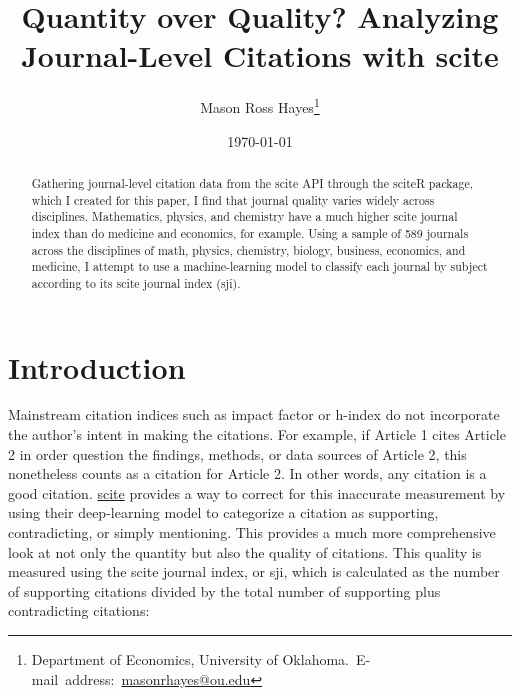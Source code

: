 \documentclass[12pt,english]{article}
\begin{document}
\begin{singlespace}
\title{Quantity over Quality? Analyzing Journal-Level Citations with scite}
\end{singlespace}

\author{Mason Ross Hayes\thanks{Department of Economics, University of Oklahoma.\
E-mail~address:~\href{mailto:masonrhayes@ou.edu}{masonrhayes@ou.edu}}}

\date{\today}

\maketitle

\begin{abstract}
\begin{singlespace}
Gathering journal-level citation data from the scite API through the sciteR package, which I created for this paper, I find that journal quality varies widely across disciplines. Mathematics, physics, and chemistry have a much higher scite journal index than do medicine and economics, for example.
Using a sample of 589 journals across the disciplines of math, physics, chemistry, biology, business, economics, and medicine, I attempt to use a machine-learning model to classify each journal by subject according to its scite journal index (sji).
\end{singlespace}

\end{abstract}
\vfill{}


\pagebreak{}


\section{Introduction}\label{sec:intro}
Mainstream citation indices such as impact factor or h-index do not incorporate the author's intent in making the citations. For example, if Article 1 cites Article 2 in order question the findings, methods, or data sources of Article 2, this nonetheless counts as a citation for Article 2. In other words, any citation is a good citation. \href{https://scite.ai}{scite} provides a way to correct for this inaccurate measurement by using their deep-learning model to categorize a citation as supporting, contradicting, or simply mentioning. This provides a much more comprehensive look at not only the quantity but also the quality of citations. This quality is measured using the scite journal index, or sji, which is calculated as the number of supporting citations divided by the total number of supporting plus contradicting citations:
\end{document}
